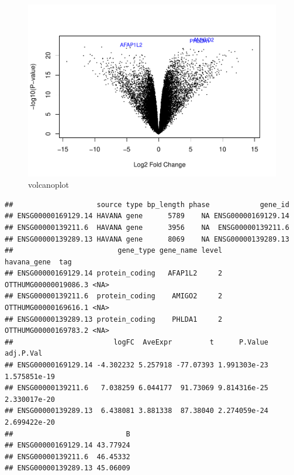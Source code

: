 \documentclass[
]{article}
\newenvironment{Shaded}{\begin{snugshade}}{\end{snugshade}}
\newcommand{\AttributeTok}[1]{\textcolor[rgb]{0.13,0.29,0.53}{#1}}
\newcommand{\CommentTok}[1]{\textcolor[rgb]{0.56,0.35,0.01}{\textit{#1}}}
\newcommand{\DecValTok}[1]{\textcolor[rgb]{0.00,0.00,0.81}{#1}}
\newcommand{\FunctionTok}[1]{\textcolor[rgb]{0.13,0.29,0.53}{\textbf{#1}}}
\newcommand{\NormalTok}[1]{#1}
\newcommand{\SpecialCharTok}[1]{\textcolor[rgb]{0.81,0.36,0.00}{\textbf{#1}}}
\newcommand{\StringTok}[1]{\textcolor[rgb]{0.31,0.60,0.02}{#1}}
\begin{document}
\begin{Shaded}
\end{Shaded}

\begin{figure}
\centering
\includegraphics{Proyecto_RNAseq_files/figure-latex/unnamed-chunk-16-1.pdf}
\caption{volcanoplot}
\end{figure}

\begin{Shaded}
\end{Shaded}

\begin{verbatim}
##                    source type bp_length phase            gene_id
## ENSG00000169129.14 HAVANA gene      5789    NA ENSG00000169129.14
## ENSG00000139211.6  HAVANA gene      3956    NA  ENSG00000139211.6
## ENSG00000139289.13 HAVANA gene      8069    NA ENSG00000139289.13
##                         gene_type gene_name level          havana_gene  tag
## ENSG00000169129.14 protein_coding   AFAP1L2     2 OTTHUMG00000019086.3 <NA>
## ENSG00000139211.6  protein_coding    AMIGO2     2 OTTHUMG00000169616.1 <NA>
## ENSG00000139289.13 protein_coding    PHLDA1     2 OTTHUMG00000169783.2 <NA>
##                        logFC  AveExpr         t      P.Value    adj.P.Val
## ENSG00000169129.14 -4.302232 5.257918 -77.07393 1.991303e-23 1.575851e-19
## ENSG00000139211.6   7.038259 6.044177  91.73069 9.814316e-25 2.330017e-20
## ENSG00000139289.13  6.438081 3.881338  87.38040 2.274059e-24 2.699422e-20
##                           B
## ENSG00000169129.14 43.77924
## ENSG00000139211.6  46.45332
## ENSG00000139289.13 45.06009
\end{verbatim}
\end{document}
